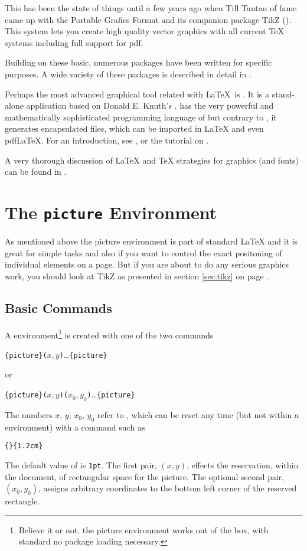 This has been the state of things until a few years ago when Till Tantau of
 fame came up with the Portable Grafics Format  and its
companion package TikZ (). This system lets you create high
quality vector graphics with all current \TeX{} systems including full
support for pdf.

Building on these basic, numerous packages have been written for specific
purposes. A wide variety of these packages is described in detail in
\graphicscompanion{}.

Perhaps the most advanced graphical tool related with \LaTeX\ is \MP. It is a stand-alone application
based on Donald E. Knuth's \MF. \MP{} has the very powerful and 
mathematically sophisticated programming language of \MF{} but contrary to \MF,
it generates encapsulated \PSi{} files, 
which can be imported in \LaTeX{} and even pdf\LaTeX{}. For an introduction, see \hobby, or the tutorial on \cite{ursoswald}.

A very thorough discussion of \LaTeX{} and \TeX{} strategies for graphics (and fonts) can 
be found in \hoenig.

\section{The \texttt{picture} Environment}

As mentioned above the picture environment is part of standard \LaTeX{} and it is great for simple tasks and also if you want
to control the exact positoning of individual elements on a page. But if you are about to do any serious graphics work, you should
look at TikZ as presented in section \ref{sec:tikz} on page \pageref{sec:tikz}.

\subsection{Basic Commands}

A  environment\footnote{Believe it or not, the picture environment works out of the
box, with standard \LaTeXe{} no package loading necessary.} is created with one of the two commands
\begin{lscommand}
\verb|{picture}(|$x,y$\verb|)|\ldots{}\verb|{picture}|
\end{lscommand}
\noindent or
\begin{lscommand}
\verb|{picture}(|$x,y$\verb|)(|$x_0,y_0$\verb|)|\ldots{}\verb|{picture}|
\end{lscommand}
The numbers $x,\,y,\,x_0,\,y_0$ refer to , which can be reset any time
(but not within a  environment) with a command such as
\begin{lscommand}
\verb|{|\verb|}{1.2cm}|
\end{lscommand}
The default value of  is \texttt{1pt}. The first pair, $(x,y)$, effects
the reservation, within the document, of rectangular space for the picture. The optional
second pair, $(x_0,y_0)$, assigns arbitrary coordinates to the bottom left corner of the
reserved rectangle. 

